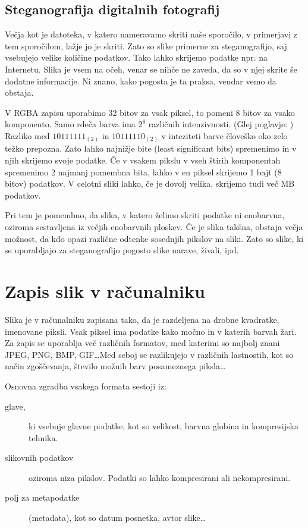 \documentclass[a4paper, 12pt]{article}
\begin{document}
    \subsection{Steganografija digitalnih fotografij}
        \label{steganografijaslik}
        Večja kot je datoteka, v katero nameravamo skriti naše sporočilo, v primerjavi z tem sporočilom, lažje jo je skriti. Zato so slike primerne za steganografijo, saj vsebujejo velike količine podatkov. Tako lahko skrijemo podatke npr. na Internetu. Slika je vsem na očeh, venar se nihče ne zaveda, da so v njej skrite še dodatne informacije. Ni znano, kako pogosta je ta praksa, vendar vemo da obstaja.
        
        V RGBA zapisu uporabimo 32 bitov za vsak piksel, to pomeni 8 bitov za vsako komponento. Samo rdeča barva ima $2^8$ različnih intenzivnosti. (Glej poglavje: ) Razliko med $10111111_{(2)}$ in $10111110_{(2)}$ v inteziteti barve človeško oko zelo težko prepozna. Zato lahko najnižje bite (least significant bits) spremenimo in v njih skrijemo svoje podatke. Če v vsakem pikslu v vseh štirih komponentah spremenimo 2 najmanj pomembna bita, lahko v en piksel skrijemo 1 bajt (8 bitov) podatkov. V celotni sliki lahko, če je dovolj velika, skrijemo tudi več MB podatkov.

        Pri tem je pomembno, da slika, v katero želimo skriti podatke ni enobarvna, oziroma sestavljena iz večjih enobarvnih ploskev. Če je slika takšna, obstaja večja možnost, da kdo opazi različne odtenke sosednjih pikslov na sliki. Zato so slike, ki se uporabljajo za steganografijo pogosto slike narave, živali, ipd.
        
\section{Zapis slik v računalniku}
    \label{zapisslik}
    Slika je v računalniku zapisana tako, da je razdeljena na drobne kvadratke, imenovane piksli. Vsak piksel ima podatke kako močno in v katerih barvah žari. Za zapis se uporablja več različnih formatov, med katerimi so najbolj znani JPEG, PNG, BMP, GIF\ldots Med seboj se razlikujejo v različnih lastnostih, kot so način zgoščevanja, število možnih barv posameznega piksla\ldots

    Osnovna zgradba vsakega formata sestoji iz:
    \begin{description}
        \item [glave,] ki vsebuje glavne podatke, kot so velikost, barvna globina in kompresijska tehnika. 
        \item [slikovnih podatkov] oziroma niza pikslov. Podatki so lahko kompresirani ali nekompresirani.
        \item [polj za metapodatke] (metadata), kot so datum posnetka, avtor slike\ldots
    \end{description} 
\end{document}
